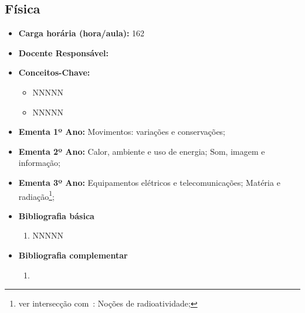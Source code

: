 \documentclass[11pt,fleqn]{book} %
\begin{document}
\newpage
\subsection{Física}\label{disc:fisica}
\begin{itemize}
	\item \textbf{Carga horária (hora/aula):} 162
	\item \textbf{Docente Responsável:}
	\item \textbf{Conceitos-Chave:}
	\begin{itemize}
		\item NNNNN
		\item NNNNN
	\end{itemize}
	\item \textbf{Ementa 1º Ano:} 
	Movimentos: variações e conservações;
	\item \textbf{Ementa 2º Ano:}	
	Calor, ambiente e uso de energia;
	Som, imagem e informação;
	\item \textbf{Ementa 3º Ano:}	
	Equipamentos elétricos e telecomunicações;
	Matéria e radiação\footnote{ver intersecção com~: Noções de radioatividade;};
	\item \textbf{Bibliografia básica}
	\begin{enumerate}
		\item NNNNN
	\end{enumerate}
	\item \textbf{Bibliografia complementar}
	\begin{enumerate}
		\item 
	\end{enumerate}	
\end{itemize}


\newpage
\end{document}
